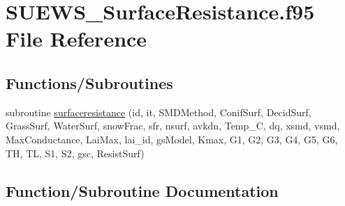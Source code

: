 \hypertarget{_s_u_e_w_s___surface_resistance_8f95}{}\section{S\+U\+E\+W\+S\+\_\+\+Surface\+Resistance.\+f95 File Reference}
\label{_s_u_e_w_s___surface_resistance_8f95}
\subsection*{Functions/\+Subroutines}
\begin{DoxyCompactItemize}
\item 
subroutine \hyperlink{_s_u_e_w_s___surface_resistance_8f95_a4da071a736ca3e2e388c9f1f3b3e6ea7}{surfaceresistance} (id, it, S\+M\+D\+Method, Conif\+Surf, Decid\+Surf, Grass\+Surf, Water\+Surf, snow\+Frac, sfr, nsurf, avkdn, Temp\+\_\+C, dq, xsmd, vsmd, Max\+Conductance, Lai\+Max, lai\+\_\+id, gs\+Model, Kmax, G1, G2, G3, G4, G5, G6, TH, TL, S1, S2, gsc, Resist\+Surf)
\end{DoxyCompactItemize}


\subsection{Function/\+Subroutine Documentation}
\mbox{\label{_s_u_e_w_s___surface_resistance_8f95_a4da071a736ca3e2e388c9f1f3b3e6ea7}} 
